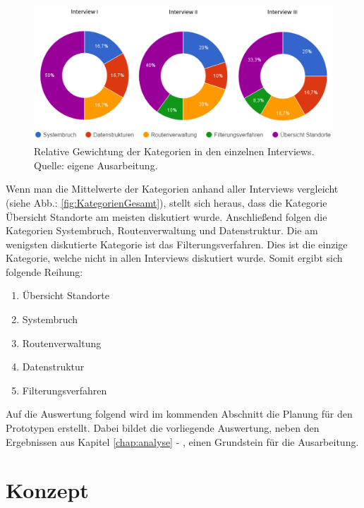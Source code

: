 \documentclass[Bachelorarbeit.tex]{subfiles}
\begin{document}
\begin{figure}[H]
	\centering
	\includegraphics[width=0.9\linewidth]{img/Interviews/VerteilungNachInterview}
	\caption[Relative Gewichtung der Kategorien in den einzelnen Interviews]{Relative Gewichtung der Kategorien in den einzelnen Interviews. Quelle: eigene Ausarbeitung.}
	\label{fig:GewichtungNachInterview}
\end{figure}

Wenn man die Mittelwerte der Kategorien anhand aller Interviews vergleicht (siehe Abb.: \ref{fig:KategorienGesamt}), stellt sich heraus, dass die Kategorie Übersicht Standorte am meisten diskutiert wurde. 
Anschließend folgen die Kategorien Systembruch, Routenverwaltung und Datenstruktur.
Die am wenigsten diskutierte Kategorie ist das Filterungsverfahren. 
Dies ist die einzige Kategorie, welche nicht in allen Interviews diskutiert wurde.
Somit ergibt sich folgende Reihung:

\begin{enumerate}
	\item Übersicht Standorte
	\item Systembruch
	\item Routenverwaltung
	\item Datenstruktur
	\item Filterungsverfahren
\end{enumerate}

Auf die Auswertung folgend wird im kommenden Abschnitt  die Planung für den Prototypen erstellt.
Dabei bildet die vorliegende Auswertung, neben den Ergebnissen aus Kapitel \ref{chap:analyse} - , einen Grundstein für die Ausarbeitung.

\newpage

\section{Konzept}
\label{chap:entwicklung:sec:konzept}
\end{document}
